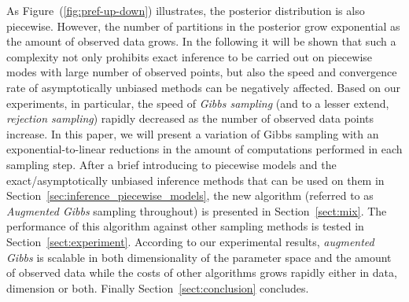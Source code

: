 \vspace{2mm}
As Figure~(\ref{fig:pref-up-down}) illustrates, the posterior distribution is also piecewise.
However, the number of partitions in the posterior grow exponential as the amount of observed data grows.
In the following it will be shown that such a complexity not only prohibits exact inference to be carried out on piecewise modes with large number of observed points, but also the speed and convergence rate of asymptotically unbiased methods can be negatively affected.
Based on our experiments, in particular, the speed of \emph{Gibbs sampling} 
(and to a lesser extend, \emph{rejection sampling}) rapidly decreased as the number of observed data points increase.
In this paper, we will present a variation of Gibbs sampling with an exponential-to-linear reductions in the amount of computations performed in each sampling step. 
After a brief introducing to piecewise models and the exact/asymptotically unbiased inference methods that can be used on them in Section~\ref{sec:inference_piecewise_models}, the new algorithm (referred to as \emph{Augmented Gibbs} sampling throughout) is presented in Section~\ref{sect:mix}.
The performance of this algorithm against other sampling methods is tested in Section~\ref{sect:experiment}. 
According to our experimental results, \emph{augmented Gibbs} is scalable in both dimensionality of the parameter space and the amount of observed data while the costs of other algorithms grows rapidly either in data, dimension or both. Finally Section~\ref{sect:conclusion} concludes.
